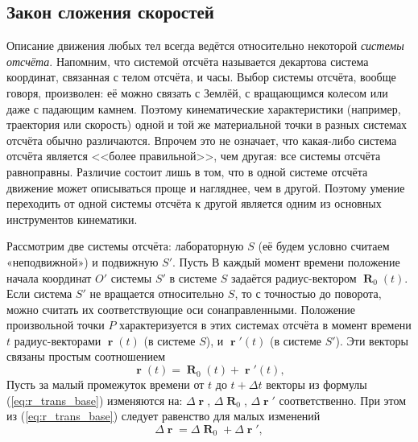 \documentclass[../main.tex]{subfiles}
\begin{document}






\subsection{Закон сложения скоростей}

Описание движения любых тел всегда ведётся относительно некоторой \textit{системы отсчёта}. Напомним, что системой отсчёта называется декартова система координат, связанная с телом отсчёта, и часы. Выбор системы отсчёта, вообще говоря, произволен: её можно связать с Землёй, с вращающимся колесом или даже с падающим камнем. Поэтому кинематические характеристики (например, траектория или скорость) одной и той же материальной точки в разных системах отсчёта обычно различаются. Впрочем это не означает, что какая-либо система отсчёта является <<более правильной>>, чем другая: все системы отсчёта равноправны. Различие состоит лишь в том, что в одной системе отсчёта движение может описываться проще и нагляднее, чем в другой. Поэтому умение переходить от одной системы отсчёта к другой является одним из основных инструментов кинематики.

Рассмотрим две системы отсчёта: лабораторную $S$ (её будем условно считаем «неподвижной») и подвижную $S'$.
Пусть В каждый момент времени положение начала координат $O'$ системы $S'$ в системе $S$ задаётся радиус-вектором $\mbfR_0(t)$. \mbox{Если} система $S'$ не вращается относительно $S$, то с точностью до поворота, можно считать их соответствующие оси сонаправленными. Положение произвольной точки $P$ характеризуется в этих системах отсчёта в момент времени $t$ радиус-векторами $\mbfr(t)$  (в системе $S$), и $\mbfr'(t)$ (в системе $S'$). Эти векторы связаны простым соотношением
\begin{equation}
\mbfr(t) = \mbfR_0(t) + \mbfr'(t),
\label{eq:r_trans_base}
\end{equation}
Пусть за малый промежуток времени от $t$ до $t + \Delta t$ векторы из формулы (\ref{eq:r_trans_base}) изменяются на: $\Delta \mbfr$, $\Delta \mbfR_0$,  $\Delta \mbfr'$ соответственно. При этом из (\ref{eq:r_trans_base}) следует равенство для малых изменений 
\begin{equation*}
\Delta \mbfr = \Delta \mbfR_0 + \Delta \mbfr',
\end{equation*}
\end{document}
